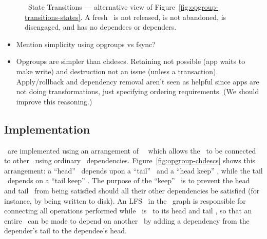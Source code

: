\begin{figure}[htb]
\caption{\label{fig:opgroup-transitions-intuition} \Opgroup\ State
  Transitions --- alternative view of
  Figure~\ref{fig:opgroup-transitions-states}. A fresh \opgroup\ is
  not released, is not abandoned, is disengaged, and has no dependees
  or dependers.}
\end{figure}


\begin{itemize}
\item Mention simplicity using opgroups vs fsync?
\item Opgroups are simpler than chdescs. Retaining not possible (app
  waits to make write) and destruction not an issue (unless a
  transaction). Apply/rollback and dependency removal aren't seen as
  helpful since apps are not doing transformations, just specifying
  ordering requirements. (We should improve this reasoning.)
\end{itemize}


\subsection{Implementation}
\label{sec:opgroup:implementation}


\Opgroups\ are implemented using an arrangement of \noop\ \chdescs\ which allows
the \opgroup\ to be connected to other \opgroups\ using ordinary \chdesc\
dependencies.  Figure~\ref{fig:opgroup-chdescs} shows this arrangement: a
``head'' \chdesc\ depends upon a ``tail'' \chdesc\ and a ``head keep'' \chdesc,
while the tail \chdesc\ depends on a ``tail keep'' \chdesc. The purpose of the
``keep'' \chdescs\ is to prevent the head and tail \chdescs\ from being
satisfied should all their other dependencies be satisfied (for instance, by
being written to disk). An LFS \module\ in the \module\ graph is responsible for
connecting all operations performed while \anopgroup\ is \engaged\ to its head
and tail \chdescs, so that an entire \opgroup\ can be made to depend on another
\opgroup\ by adding a dependency from the depender's tail to the dependee's
head.

